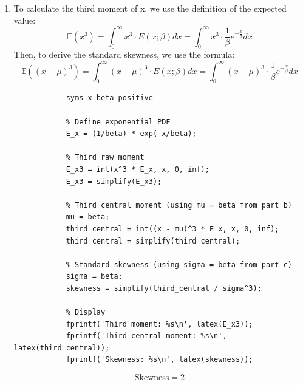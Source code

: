\documentclass[10pt]{article}
\begin{document}
\begin{enumerate}[label=(\alph*)]
	      \begin{verbatim}		
			syms x beta m positive

			% Define exponential PDF
			E_x = (1/beta) * exp(-x/beta);

			% Compute CDF from 0 to m
			CDF = int(E_x, x, 0, m);
			CDF = simplify(CDF);

			% Solve CDF = 0.5 for median
			median_val = solve(CDF == 0.5, m);
			median_val = simplify(median_val);

			% Display
			fprintf('CDF: %s\n', latex(CDF));
			fprintf('Median: %s\n', latex(median_val));
		  \end{verbatim}

	      \[ \boxed{\text{Median} = \beta \ln(2)} \]


	\item To calculate the third moment of x, we use the definition of the expected value:
	      \[ \mathbb{E}(x^3) = \int_0^\infty x^3 \cdot E(x;\beta) dx = \int_0^\infty x^3 \cdot \frac{1}{\beta} e^{-\frac{x}{\beta}} dx \]
	      Then, to derive the standard skewness, we use the formula:
	      \[ \mathbb{E}((x-\mu)^3) = \int_0^\infty (x-\mu)^3 \cdot E(x;\beta) dx = \int_0^\infty (x-\mu)^3 \cdot \frac{1}{\beta} e^{-\frac{x}{\beta}} dx \]


	      \begin{verbatim}
			syms x beta positive

			% Define exponential PDF
			E_x = (1/beta) * exp(-x/beta);

			% Third raw moment
			E_x3 = int(x^3 * E_x, x, 0, inf);
			E_x3 = simplify(E_x3);

			% Third central moment (using mu = beta from part b)
			mu = beta;
			third_central = int((x - mu)^3 * E_x, x, 0, inf);
			third_central = simplify(third_central);

			% Standard skewness (using sigma = beta from part c)
			sigma = beta;
			skewness = simplify(third_central / sigma^3);

			% Display
			fprintf('Third moment: %s\n', latex(E_x3));
			fprintf('Third central moment: %s\n', latex(third_central));
			fprintf('Skewness: %s\n', latex(skewness));
		  \end{verbatim}

	      \[ \boxed{\text{Skewness} = 2} \]

\end{enumerate}
\end{document}
